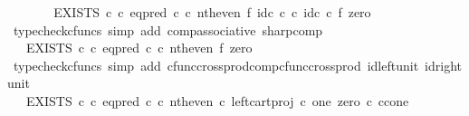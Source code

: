 \begin{isabellebody}
\ \ \isamarkupfalse%
\ \isamarkupfalse%
\ {\isachardoublequoteopen}{\isachardot}{\kern0pt}{\isachardot}{\kern0pt}{\isachardot}{\kern0pt}\ {\isacharequal}{\kern0pt}\ EXISTS\ {\isasymnat}\isactrlsub c\ {\isasymcirc}\isactrlsub c\ {\isacharparenleft}{\kern0pt}eq{\isacharunderscore}{\kern0pt}pred\ {\isasymnat}\isactrlsub c\ {\isasymcirc}\isactrlsub c\ {\isacharparenleft}{\kern0pt}nth{\isacharunderscore}{\kern0pt}even\ {\isasymtimes}\isactrlsub f\ id\isactrlsub c\ {\isasymnat}\isactrlsub c{\isacharparenright}{\kern0pt}\ {\isasymcirc}\isactrlsub c\ {\isacharparenleft}{\kern0pt}id\isactrlsub c\ {\isasymnat}\isactrlsub c\ {\isasymtimes}\isactrlsub f\ zero{\isacharparenright}{\kern0pt}{\isacharparenright}{\kern0pt}\isactrlsup {\isasymsharp}{\isachardoublequoteclose}\isanewline
\ \ \ \ \isamarkupfalse%
\ {\isacharparenleft}{\kern0pt}typecheck{\isacharunderscore}{\kern0pt}cfuncs{\isacharcomma}{\kern0pt}\ simp\ add{\isacharcolon}{\kern0pt}\ comp{\isacharunderscore}{\kern0pt}associative{}\ sharp{\isacharunderscore}{\kern0pt}comp{\isacharparenright}{\kern0pt}\isanewline
\ \ \isamarkupfalse%
\ \isamarkupfalse%
\ {\isachardoublequoteopen}{\isachardot}{\kern0pt}{\isachardot}{\kern0pt}{\isachardot}{\kern0pt}\ {\isacharequal}{\kern0pt}\ EXISTS\ {\isasymnat}\isactrlsub c\ {\isasymcirc}\isactrlsub c\ {\isacharparenleft}{\kern0pt}eq{\isacharunderscore}{\kern0pt}pred\ {\isasymnat}\isactrlsub c\ {\isasymcirc}\isactrlsub c\ {\isacharparenleft}{\kern0pt}nth{\isacharunderscore}{\kern0pt}even\ {\isasymtimes}\isactrlsub f\ zero{\isacharparenright}{\kern0pt}{\isacharparenright}{\kern0pt}\isactrlsup {\isasymsharp}{\isachardoublequoteclose}\isanewline
\ \ \ \ \isamarkupfalse%
\ {\isacharparenleft}{\kern0pt}typecheck{\isacharunderscore}{\kern0pt}cfuncs{\isacharcomma}{\kern0pt}\ simp\ add{\isacharcolon}{\kern0pt}\ cfunc{\isacharunderscore}{\kern0pt}cross{\isacharunderscore}{\kern0pt}prod{\isacharunderscore}{\kern0pt}comp{\isacharunderscore}{\kern0pt}cfunc{\isacharunderscore}{\kern0pt}cross{\isacharunderscore}{\kern0pt}prod\ id{\isacharunderscore}{\kern0pt}left{\isacharunderscore}{\kern0pt}unit{}\ id{\isacharunderscore}{\kern0pt}right{\isacharunderscore}{\kern0pt}unit{}{\isacharparenright}{\kern0pt}\isanewline
\ \ \isamarkupfalse%
\ \isamarkupfalse%
\ {\isachardoublequoteopen}{\isachardot}{\kern0pt}{\isachardot}{\kern0pt}{\isachardot}{\kern0pt}\ {\isacharequal}{\kern0pt}\ EXISTS\ {\isasymnat}\isactrlsub c\ {\isasymcirc}\isactrlsub c\ {\isacharparenleft}{\kern0pt}eq{\isacharunderscore}{\kern0pt}pred\ {\isasymnat}\isactrlsub c\ {\isasymcirc}\isactrlsub c\ {\isasymlangle}nth{\isacharunderscore}{\kern0pt}even\ {\isasymcirc}\isactrlsub c\ left{\isacharunderscore}{\kern0pt}cart{\isacharunderscore}{\kern0pt}proj\ {\isasymnat}\isactrlsub c\ one{\isacharcomma}{\kern0pt}\ zero\ {\isasymcirc}\isactrlsub c\ {\isasymbeta}\isactrlbsub {\isasymnat}\isactrlsub c{\isasymtimes}\isactrlsub cone\isactrlesub {\isasymrangle}\ {\isacharparenright}{\kern0pt}\isactrlsup {\isasymsharp}{\isachardoublequoteclose}\isanewline

\end{isabellebody}
